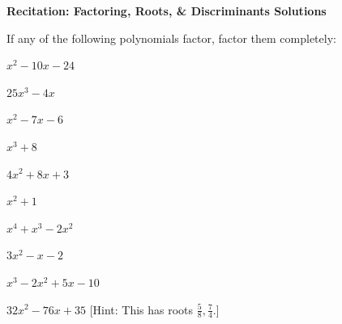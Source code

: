 \documentclass[11pt,letterpaper]{article}
\begin{document}

\phantom{} \hfill {\bfseries \Large Recitation: Factoring, Roots, \& Discriminants Solutions} \hfill \phantom{} \par\vspace{0.3cm}

 If any of the following polynomials factor, factor them completely:
	\begin{2enumerate}
	\item $x^2 - 10x - 24$
	\item $25x^3 - 4x$
	\item $x^2 - 7x - 6$
	\item $x^3 + 8$
	\item $4x^2 + 8x + 3$
	\item $x^2 + 1$
	\item $x^4 + x^3 - 2x^2$
	\item $3x^2 - x - 2$
	\item $x^3 - 2x^2 + 5x - 10$
	\item $32x^2 - 76x + 35$ [Hint: This has roots $\tfrac{5}{8}, \tfrac{7}{4}$.]
	\end{2enumerate} 
\end{document}
